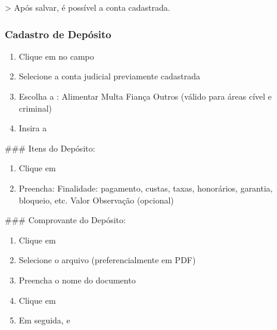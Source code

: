 \documentclass[letterpaper,10pt,brazil]{sphinxmanual}
\begin{document}
\sphinxAtStartPar
\textgreater{} Após salvar, é possível  a conta cadastrada.


\subsubsection{Cadastro de Depósito}
\label{\detokenize{projud_20_cadastrodeposito:cadastro-de-deposito}}\begin{enumerate}
%
\item {} 
\sphinxAtStartPar
Clique em  no campo 

\item {} 
\sphinxAtStartPar
Selecione a conta judicial previamente cadastrada

\item {} 
\sphinxAtStartPar
Escolha a :
\sphinxhyphen{} Alimentar
\sphinxhyphen{} Multa
\sphinxhyphen{} Fiança
\sphinxhyphen{} Outros (válido para áreas cível e criminal)

\item {} 
\sphinxAtStartPar
Insira a 

\end{enumerate}

\sphinxAtStartPar
\#\#\# Itens do Depósito:
\begin{enumerate}
%
\item {} 
\sphinxAtStartPar
Clique em 

\item {} 
\sphinxAtStartPar
Preencha:
\sphinxhyphen{} Finalidade: pagamento, custas, taxas, honorários, garantia, bloqueio, etc.
\sphinxhyphen{} Valor
\sphinxhyphen{} Observação (opcional)

\end{enumerate}

\sphinxAtStartPar
\#\#\# Comprovante do Depósito:
\begin{enumerate}
%
\item {} 
\sphinxAtStartPar
Clique em 

\item {} 
\sphinxAtStartPar
Selecione o arquivo (preferencialmente em PDF)

\item {} 
\sphinxAtStartPar
Preencha o nome do documento

\item {} 
\sphinxAtStartPar
Clique em 

\item {} 
\sphinxAtStartPar
Em seguida,  e 

\end{enumerate}
\end{document}
